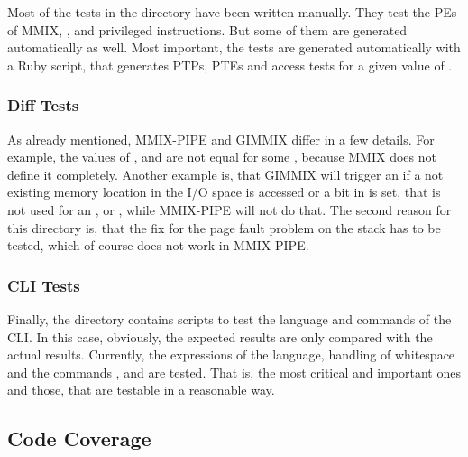 Most of the tests in the  directory have been written manually. They test the PEs of MMIX, ,  and privileged instructions. But some of them are generated automatically as well. Most important, the  tests are generated automatically with a \gls{Ruby} script, that generates PTPs, PTEs and access tests for a given value of .

\subsubsection{Diff Tests}

As already mentioned, MMIX-PIPE and GIMMIX differ in a few details. For example, the values of ,  and  are not equal for some , because MMIX does not define it completely. Another example is, that GIMMIX will trigger an  if a not existing memory location in the I/O space is accessed or a bit in  is set, that is not used for an ,  or , while MMIX-PIPE will not do that. The second reason for this directory is, that the fix for the page fault problem on the stack has to be tested, which of course does not work in MMIX-PIPE.

\subsubsection{CLI Tests}

Finally, the directory  contains scripts to test the language and commands of the CLI. In this case, obviously, the expected results are only compared with the actual results. Currently, the expressions of the language, handling of whitespace and the commands ,  and  are tested. That is, the most critical and important ones and those, that are testable in a reasonable way.

\subsection{Code Coverage}

